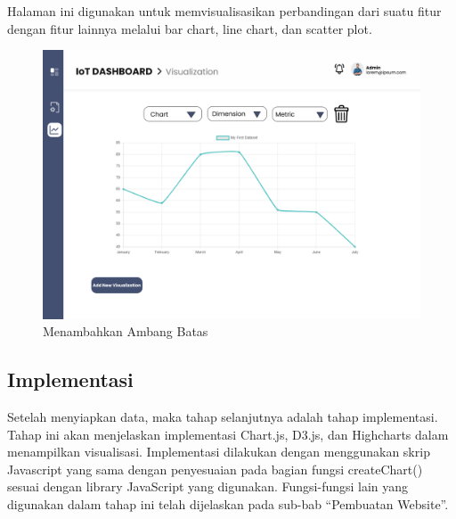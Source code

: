 \begin{enumerate}[label={\arabic*.}]
	 Halaman ini digunakan untuk memvisualisasikan perbandingan dari suatu fitur dengan fitur lainnya melalui bar chart, line chart, dan scatter plot.
	 	 \begin{figure}[H]
	 	\centering
	 	\includegraphics[width=0.8\linewidth]{gambar/Metodologi/visualization page.png}
	 	\caption{Menambahkan Ambang Batas}
	 	\label{Menambahkan Ambang Batas}
	 \end{figure} 
\end{enumerate}
\subsection{Implementasi}
Setelah menyiapkan data, maka tahap selanjutnya adalah tahap implementasi. Tahap ini akan menjelaskan implementasi Chart.js, D3.js, dan Highcharts dalam menampilkan visualisasi. Implementasi dilakukan dengan menggunakan skrip Javascript yang sama dengan penyesuaian pada bagian fungsi createChart() sesuai dengan library JavaScript yang digunakan. Fungsi-fungsi lain yang digunakan dalam tahap ini telah dijelaskan pada sub-bab “Pembuatan Website”. 

